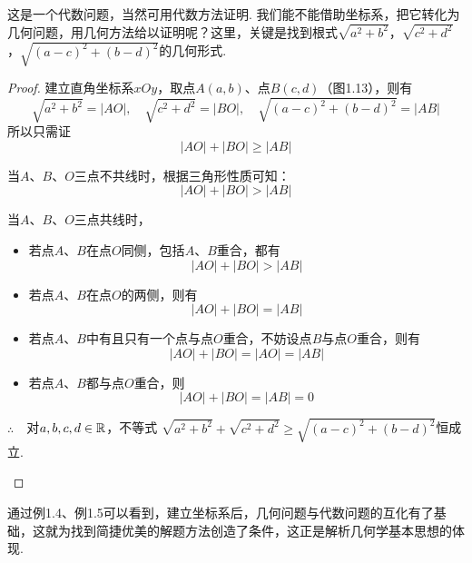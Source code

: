 \begin{analyze}
    这是一个代数问题，当然可用代数方法证明. 我们能不能借助坐标系，把它转化为几何问题，用几何方法给以证明呢？这里，关键是找到根式$\sqrt{a^2+b^2}$，$\sqrt{c^2+d^2}$，$\sqrt{(a-c)^2+(b-d)^2}$的几何形式.
\end{analyze}

\begin{proof}
建立直角坐标系$xOy$，取点$A(a,b)$、点$B(c,d)$（图1.13），则有
$$\sqrt{a^2+b^2}=|AO|,\quad \sqrt{c^2+d^2}=|BO|,\quad \sqrt{(a-c)^2+(b-d)^2}=|AB|$$
所以只需证
\[|AO|+|BO|\ge |AB|\]

\begin{enumerate}[(1)]
    \item 当$A$、$B$、$O$三点不共线时，根据三角形性质可知：
    \[|AO|+|BO|> |AB|\]
\begin{minipage}{.55\textwidth}

\item 当$A$、$B$、$O$三点共线时，
\begin{itemize}
    \item 若点$A$、$B$在点$O$同侧，包括$A$、$B$重合，都有
\[|AO|+|BO|>|AB|\]
\item 若点$A$、$B$在点$O$的两侧，则有
\[|AO|+|BO|=|AB|\]    
\end{itemize}
\end{minipage}\hfill
\begin{minipage}{.45\textwidth}
\centering
{}
\end{minipage}
\begin{itemize}
\item 若点$A$、$B$中有且只有一个点与点$O$重合，不妨设点$B$与点$O$重合，则有
\[|AO|+|BO|=|AO|=|AB|\]
\item 若点$A$、$B$都与点$O$重合，则
\[|AO|+|BO|=|AB|=0\]
\end{itemize}
$\therefore\quad $对$a,b,c,d\in\mathbb{R}$，不等式
$\sqrt{a^2+b^2}+\sqrt{c^2+d^2}\ge \sqrt{(a-c)^2+(b-d)^2}$恒成立.

\end{enumerate}    
\end{proof}

通过例1.4、例1.5可以看到，建立坐标系后，几何问题与代数问题的互化有了基础，这就为找到简捷优美的解题方法创造了条件，这正是解析几何学基本思想的体现.

